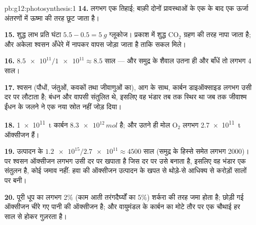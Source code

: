 \begin{solution}{pb:g12:photosynthesis:1}
\textbf{14.} लगभग एक तिहाई; बाक़ी दोनों प्रावस्थाओं के एक के बाद एक ऊर्जा
अंतरणों में ऊष्मा की तरह छूट जाता है।

\textbf{15.} शुद्ध लाभ प्रति घंटा $5.5 - 0.5 = \qty{5}{g}$ ग्लूकोज।
प्रकाश में शुद्ध $\mathrm{CO_2}$ ग्रहण की तरह नापा जाता है; और अकेला
श्वसन अँधेरे में नापकर वापस जोड़ा जाता है ताकि सकल  मिले।

\textbf{16.} $\num{8.5e11}/\num{1e11} \approx 8.5$ साल --- और समुद्र के
शैवाल उतना ही और बाँधें तो लगभग 4 साल।

\textbf{17.} श्वसन (पौधों, जंतुओं, कवकों तथा जीवाणुओं का), आग के साथ,
कार्बन डाइऑक्साइड लगभग उसी दर पर लौटाता है; बंधन और वापसी संतुलित थे, इसलिए
वह भंडार तब तक स्थिर था जब तक जीवाश्म ईंधन के जलने ने एक नया स्रोत नहीं जोड़
दिया।

\textbf{18.} \qty{1e11}{t} कार्बन $\num{8.3e12}\,\unit{mol}$ है; और उतने ही
मोल $\mathrm{O_2}$ लगभग \qty{2.7e11}{t} ऑक्सीजन हैं।

\textbf{19.} उत्पादन के $\num{1.2e15}/\num{2.7e11} \approx 4500$ साल
(समुद्र के हिस्से समेत लगभग 2000)। पर श्वसन ऑक्सीजन लगभग उसी दर पर खपाता है
जिस दर पर  उसे बनाता है, इसलिए वह भंडार एक संतुलन है, कोई
जमाव नहीं: हवा की ऑक्सीजन उत्पादन के खपत से थोड़े-से आधिक्य से करोड़ों सालों
पर बनी।

\textbf{20.} पूरी धूप का लगभग 2\% (काम आती तरंगदैर्घ्यों का 5\%) शर्करा की
तरह जमा होता है; छोड़ी गई ऑक्सीजन चीरे गए पानी की ऑक्सीजन है; और वायुमंडल
के कार्बन का मोटे तौर पर एक चौथाई हर साल  से होकर गुज़रता है।
\end{solution}
